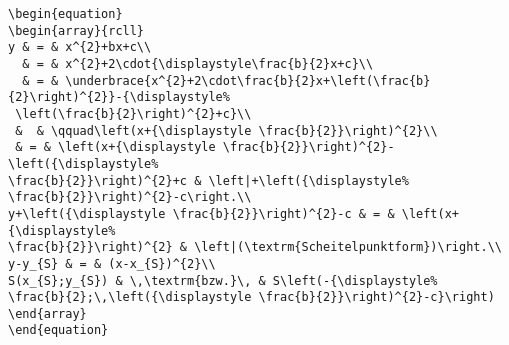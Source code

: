 \begin{table}[htb]
\begin{lstlisting}[xrightmargin=-\marginparwidth]
\begin{equation}
\begin{array}{rcll}
y & = & x^{2}+bx+c\\
  & = & x^{2}+2\cdot{\displaystyle\frac{b}{2}x+c}\\
  & = & \underbrace{x^{2}+2\cdot\frac{b}{2}x+\left(\frac{b}{2}\right)^{2}}-{\displaystyle%
 \left(\frac{b}{2}\right)^{2}+c}\\
 &  & \qquad\left(x+{\displaystyle \frac{b}{2}}\right)^{2}\\
 & = & \left(x+{\displaystyle \frac{b}{2}}\right)^{2}-\left({\displaystyle%
\frac{b}{2}}\right)^{2}+c & \left|+\left({\displaystyle%
\frac{b}{2}}\right)^{2}-c\right.\\
y+\left({\displaystyle \frac{b}{2}}\right)^{2}-c & = & \left(x+{\displaystyle%
\frac{b}{2}}\right)^{2} & \left|(\textrm{Scheitelpunktform})\right.\\
y-y_{S} & = & (x-x_{S})^{2}\\
S(x_{S};y_{S}) & \,\textrm{bzw.}\, & S\left(-{\displaystyle%
\frac{b}{2};\,\left({\displaystyle \frac{b}{2}}\right)^{2}-c}\right)
\end{array}
\end{equation}
\end{lstlisting}




\end{table}
